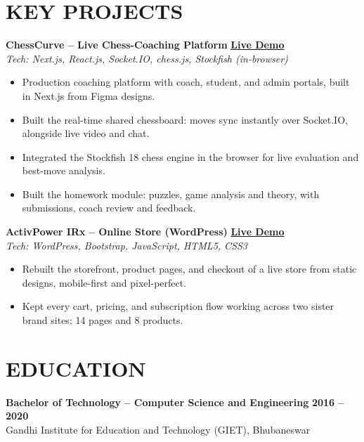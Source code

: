 \documentclass[a4paper,10pt]{article}
\begin{document}
\section{KEY PROJECTS}

\noindent\textbf{ChessCurve -- Live Chess-Coaching Platform} \hfill \href{https://classroom.chesscurve.com/}{\color{primaryBlue}\textbf{Live Demo}} \\
\textit{Tech: Next.js, React.js, Socket.IO, chess.js, Stockfish (in-browser)}
\begin{itemize}
    \item Production coaching platform with coach, student, and admin portals, built in Next.js from Figma designs.
    \item Built the real-time shared chessboard: moves sync instantly over Socket.IO, alongside live video and chat.
    \item Integrated the Stockfish 18 chess engine in the browser for live evaluation and best-move analysis.
    \item Built the homework module: puzzles, game analysis and theory, with submissions, coach review and feedback.
\end{itemize}

\vspace{2pt}

\noindent\textbf{ActivPower IRx -- Online Store (WordPress)} \hfill \href{https://activpowerirx.com/}{\color{primaryBlue}\textbf{Live Demo}} \\
\textit{Tech: WordPress, Bootstrap, JavaScript, HTML5, CSS3}
\begin{itemize}
    \item Rebuilt the storefront, product pages, and checkout of a live store from static designs, mobile-first and pixel-perfect.
    \item Kept every cart, pricing, and subscription flow working across two sister brand sites: 14 pages and 8 products.
\end{itemize}




\section{EDUCATION}
\noindent\textbf{Bachelor of Technology -- Computer Science and Engineering} \hfill \textbf{2016 -- 2020} \\
Gandhi Institute for Education and Technology (GIET), Bhubaneswar
\end{document}
